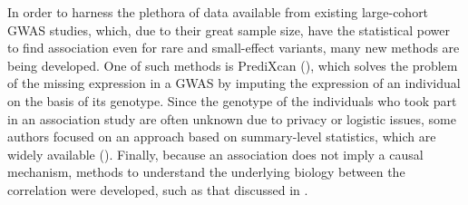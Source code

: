 \documentclass[../main.tex]{subfiles}
\begin{document}
In order to harness the plethora of data available from existing 
large-cohort GWAS studies, which, due to their great sample size, have 
the statistical power to find association even for rare and small-effect 
variants, many new methods are being developed. One of such methods is 
PrediXcan (), which solves the problem of the missing 
expression in a GWAS by imputing the expression of an individual on the 
basis of its genotype. Since the genotype of the individuals who took 
part in an association study are often unknown due to privacy or 
logistic issues, some authors focused on an approach based on 
summary-level statistics, which are widely available 
(). Finally, because an association does not imply a 
causal mechanism, methods to understand the underlying biology between 
the correlation were developed, such as that discussed in 
.
\end{document}
